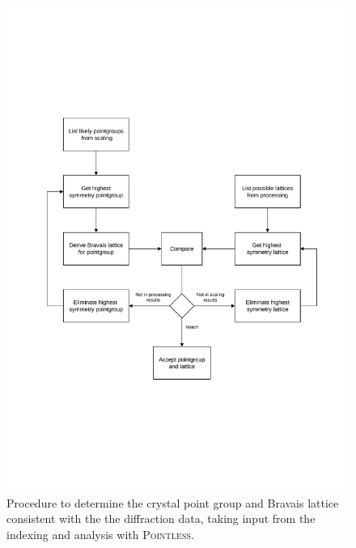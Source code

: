 \documentclass[preprint,pdf]{iucr}
\begin{document}
\begin{figure}
\caption{Procedure to determine the crystal point group and Bravais
  lattice consistent with the the diffraction data, taking input from
  the indexing and analysis with \textsc{Pointless}.
\label{figure:scaling_1}}
\centering
\includegraphics[scale=0.5]{figures/scaling-step-1.pdf}
\end{figure}
\end{document}
